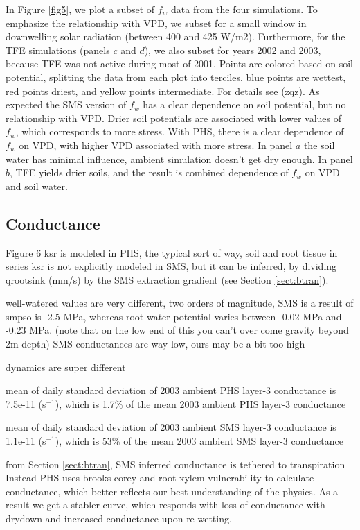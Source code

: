 \documentclass[draft,linenumbers]{agujournal}
\begin{document}
In Figure \ref{fig5}, we plot a subset of $f_w$ data from the four simulations. 
To emphasize the relationship with VPD, we subset for a small window in downwelling solar radiation (between 400 and 425 W/m2).
Furthermore, for the TFE simulations (panels $c$ and $d$), we also subset for years 2002 and 2003, because TFE was not active during most of 2001.
Points are colored based on soil potential, splitting the data from each plot into terciles, blue points are wettest, red points driest, and yellow points intermediate.
For details see (zqz).
As expected the SMS version of $f_w$ has a clear dependence on soil potential, but no relationship with VPD. 
Drier soil potentials are associated with lower values of $f_w$, which corresponds to more stress.
With PHS, there is a clear dependence of $f_w$ on VPD, with higher VPD associated with more stress.
In panel $a$ the soil water has minimal influence, ambient simulation doesn't get dry enough.
In panel $b$, TFE yields drier soils, and the result is combined dependence of $f_w$ on VPD and soil water.


\subsection{Conductance}
Figure 6
ksr is modeled in PHS, the typical sort of way, soil and root tissue in series
ksr is not explicitly modeled in SMS, but it can be inferred, by dividing qrootsink (mm/s) by the SMS extraction gradient (see Section \ref{sect:btran}).

well-watered values are very different, two orders of magnitude, SMS is a result of smpso is -2.5 MPa, 
whereas root water potential varies between -0.02 MPa and -0.23 MPa. 
(note that on the low end of this you can't over come gravity beyond 2m depth)
SMS conductances are way low, ours may be a bit too high

dynamics are super different

mean of daily standard deviation of 2003 ambient PHS layer-3 conductance is 7.5e-11 (s$^{-1}$),
which is 1.7\% of the mean 2003 ambient PHS layer-3 conductance

mean of daily standard deviation of 2003 ambient SMS layer-3 conductance is 1.1e-11 (s$^{-1}$),
which is 53\% of the mean 2003 ambient SMS layer-3 conductance

from Section \ref{sect:btran}, SMS inferred conductance is tethered to transpiration
Instead PHS uses brooks-corey and root xylem vulnerability to calculate conductance, which better reflects our best understanding of the physics.
As a result we get a stabler curve, which responds with loss of conductance with drydown and increased conductance upon re-wetting.
\end{document}
